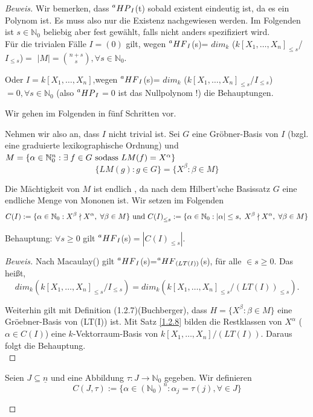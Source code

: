 \documentclass{article}
\newcommand*{\R}{k[X_{1},\ldots,X_{n}]}
\newcommand*{\indx}[2]{{#1}_{#2}}
\newcommand*{\potx}[2]{{#1}^{#2}}
\newcommand*{\N}{\mathbb{N}_0}
\newcommand*{\hf}[1]{$\prescript{a}{}{HF}_{#1}$}
\newcommand*{\hp}[1]{$\prescript{a}{}{HP}_{#1}$}
\begin{document}
\begin{proof}[Beweis]
	Wir bemerken, dass \hp{I}(t) sobald existent eindeutig ist, da es ein Polynom ist. Es muss also nur die Existenz nachgewiesen werden. Im Folgenden ist $s\in \N$ beliebig aber fest gewählt, falls nicht anders spezifiziert wird.\\
	
	Für die trivialen Fälle $I=(0)$ gilt, wegen \hf{I}(s)= $\indx{dim}{k}$ ($\indx{\R}{\leq s}$/$\indx{I}{\leq s}$)$=$ $\left|M\right|=\binom{n+s}{s}, \forall s\in \N$.
	
	Oder $I=\R$,wegen \hf{I}(s)= $\indx{dim}{k}$ ($\indx{\R}{\leq s}$/$\indx{I}{\leq s}$)$=0, \forall s\in \N$  (also \hp{I}$=0$ ist das Nullpolynom !) die Behauptungen.
	
	
	Wir gehen im Folgenden in fünf Schritten vor.\\
	\begin{compactenum}
		
		\item Nehmen wir also an, dass $I$ nicht trivial ist. Sei $G$ eine Gröbner-Basis von $I$ (bzgl. eine graduierte lexikographische Ordnung) und $M=\{\alpha \in \N^n:\exists\;f\in G \textnormal{ sodass } LM(f)=\potx{X}{\alpha}\}$
		\begin{displaymath}
		\{LM(g):g\in G\}=\{\potx{X}{\beta}:\beta \in M \}
		\end{displaymath}
		
		 Die Mächtigkeit von $M$ ist endlich , da nach dem Hilbert'sche Basissatz $G$ eine endliche Menge von Mononen ist.
		Wir setzen im Folgenden 
		\begin{displaymath}
		C(I):=\{\alpha \in \N: \potx{X}{\beta} \nmid \potx{X}{\alpha},\; \forall \beta \in M \}
		\textnormal{ und } 
		\indx{C(I)}{\leq s}:= \{\alpha \in \N:|\alpha|\leq s, \; \potx{X}{\beta} \nmid \potx{X}{\alpha},\; \forall \beta \in M \}
		\end{displaymath}
		
Behauptung: $\forall s\geq 0$ gilt \hf{I}(s)$=|\indx{C(I)}{\leq s}|$.\\

\begin{proof}[Beweis]
Nach Macaulay() gilt \hf{I}(s)=\hf{(LT(I))}(s), für alle $ \in s\geq0$. Das heißt,
\begin{displaymath}
\indx{dim}{k} (\indx{\R}{\leq s}/\indx{I}{\leq s})=\indx{dim}{k}(\indx{\R}{\leq s}/\indx{(LT(I))}{\leq s}).
\end{displaymath}

Weiterhin gilt mit Definition (1.2.7)(Buchberger), dass $H=\{\potx{X}{\beta}:\beta \in M \}$ eine Gröebner-Basis von (LT(I)) ist. Mit Satz \ref{1.2.8} bilden die Restklassen von $\potx{X}{\alpha}$ ($\alpha\in C(I)$) eine $k$-Vektorraum-Basis von $\R/(LT(I))$. Daraus folgt die Behauptung.\\
\end{proof}
\item Seien $J\subseteq \underline{n}$ und eine Abbildung $\tau:J\longrightarrow \N$ gegeben. Wir definieren
\begin{displaymath}
C(J,\tau):=\{\alpha \in (\N)^n: \indx{\alpha}{j}=\tau(j), \forall \in J  \}
\end{displaymath}


\end{compactenum}
\end{proof}
\end{document}
